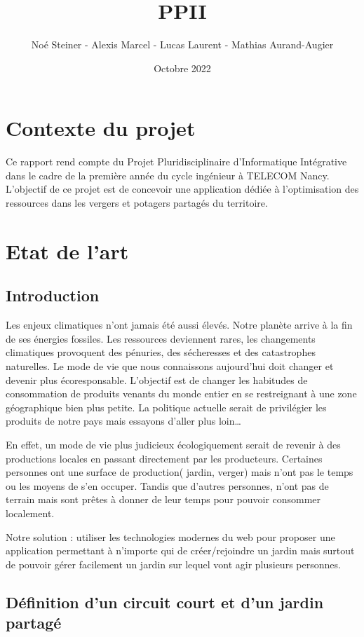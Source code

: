 \documentclass[french,a4paper]{article}
\title{PPII}
\author{Noé Steiner - Alexis Marcel - Lucas Laurent - Mathias Aurand-Augier}
\date{Octobre 2022}
\begin{document}
\maketitle
\newpage
\tableofcontents
\newpage
\section{Contexte du projet}
Ce rapport rend compte du Projet Pluridisciplinaire d’Informatique Intégrative dans le cadre de la première année du cycle ingénieur à TELECOM Nancy.
L’objectif de ce projet est de concevoir une application dédiée à l’optimisation des ressources dans les vergers et potagers partagés du territoire.

\newpage
\section{Etat de l'art}
\subsection{Introduction}
Les enjeux climatiques n’ont jamais été aussi élevés. Notre planète arrive à la fin de ses énergies fossiles. Les ressources deviennent rares, les changements climatiques provoquent des pénuries, des sécheresses et des catastrophes naturelles. Le mode de vie que nous connaissons aujourd’hui doit changer et devenir plus écoresponsable. L’objectif est de changer les habitudes de consommation de produits venants du monde entier en se restreignant à une zone géographique bien plus petite. La politique actuelle serait de privilégier les produits de notre pays mais essayons d’aller plus loin…

En effet, un mode de vie plus judicieux écologiquement serait de revenir à des productions locales en passant directement par les producteurs. Certaines personnes ont une surface de production( jardin, verger) mais n’ont pas le temps ou les moyens de s’en occuper. Tandis que d’autres personnes, n’ont pas de terrain mais sont prêtes à donner de leur temps pour pouvoir consommer localement.

Notre solution : utiliser les technologies modernes du web pour proposer une application permettant à n’importe qui de créer/rejoindre un jardin mais surtout de pouvoir gérer facilement un jardin sur lequel vont agir plusieurs personnes.

\subsection{Définition d’un circuit court et d’un jardin partagé}
\end{document}

